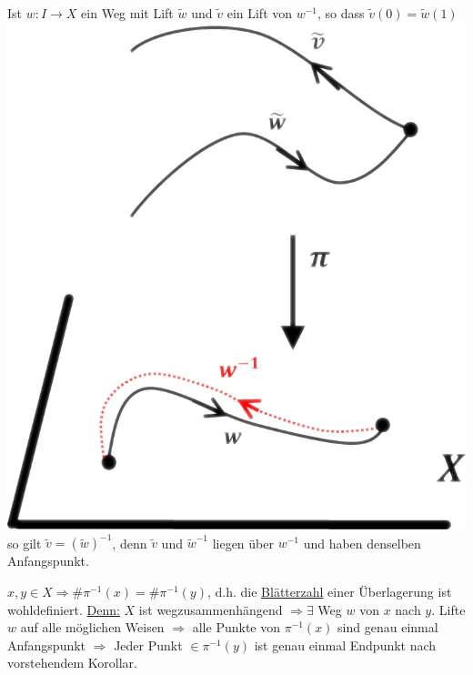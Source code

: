 \documentclass[a4paper,11pt,notitlepage]{report}
\theoremstyle{definition}
\begin{document}
\begin{corollary}
	Ist $w \colon I \rightarrow X$ ein Weg mit Lift $\widetilde{w}$ und $\widetilde{v}$ ein Lift von $w^{-1}$, so dass $\widetilde{v}(0) = \widetilde{w}(1)$ 
\newline
\includegraphics[scale=0.4]{images/Lift_inverser_Weg.png}\newline
	so gilt $\widetilde{v} = (\widetilde{w})^{-1}$, denn $\widetilde{v}$ und $\widetilde{w}^{-1}$ liegen über $w^{-1}$ und haben denselben Anfangspunkt.
\end{corollary}

\begin{corollary}
	$x,y \in X \Rightarrow \# \pi^{-1}(x) = \# \pi^{-1}(y)$, d.h. die \underline{Blätterzahl} einer Überlagerung ist wohldefiniert.
	\newline
	\underline{Denn:} $X$ ist wegzusammenhängend $\Rightarrow \exists$ Weg $w$ von $x$ nach $y$. Lifte $w$ auf alle möglichen Weisen $\Rightarrow$ alle Punkte von $\pi^{-1}(x)$ %
	sind genau einmal Anfangspunkt $\Rightarrow$ Jeder Punkt $\in \pi^{-1}(y)$ ist genau einmal Endpunkt nach vorstehendem Korollar.	
\end{corollary}
\end{document}
